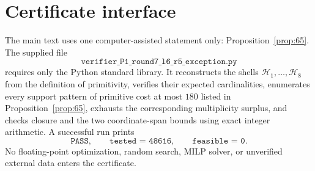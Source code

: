 \documentclass[11pt]{article}
\theoremstyle{definition}
\newcommand{\HH}{\mathcal H}
\begin{document}
\appendix
\section{Certificate interface}

The main text uses one computer-assisted statement only: Proposition~\ref{prop:65}.  The supplied file
\[
\texttt{verifier\_P1\_round7\_l6\_r5\_exception.py}
\]
requires only the Python standard library.  It reconstructs the shells \(\HH_1,\ldots,\HH_8\) from the definition of primitivity, verifies their expected cardinalities, enumerates every support pattern of primitive cost at most \(180\) listed in Proposition~\ref{prop:65}, exhausts the corresponding multiplicity surplus, and checks closure and the two coordinate-span bounds using exact integer arithmetic.  A successful run prints
\[
\texttt{PASS},\qquad
\texttt{tested = 48616},\qquad
\texttt{feasible = 0}.
\]
No floating-point optimization, random search, MILP solver, or unverified external data enters the certificate.
\end{document}
